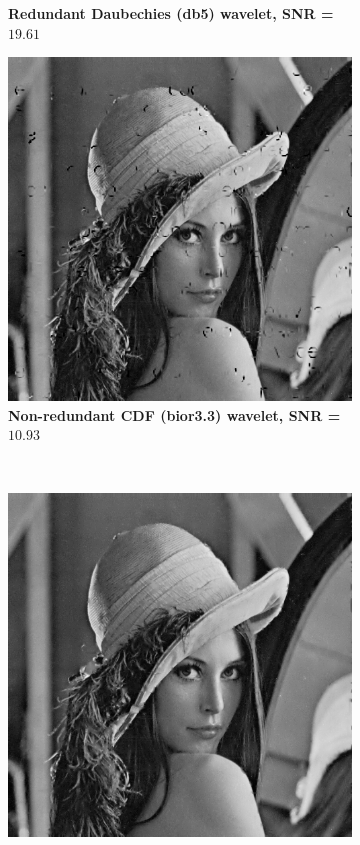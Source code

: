 \begin{figure}
\begin{subfigure}[b]{0.4\textwidth}
        \caption{\textbf{ Redundant Daubechies (db5) wavelet, SNR = $\mathbf{19.61}$} }
        \label{fig:matti_fig_rwt_db5}
    \end{subfigure}
        \begin{subfigure}[b]{0.4\textwidth}
        \includegraphics[width=\textwidth]{../src/inpainting/vraag_2_3_wt_bior33}
        \caption{\textbf{ Non-redundant CDF (bior3.3) wavelet, SNR = $\mathbf{10.93}$} }
        \label{fig:matti_fig_wt_bior33}
    \end{subfigure}
    ~ %
    \begin{subfigure}[b]{0.4\textwidth}
        \includegraphics[width=\textwidth]{../src/inpainting/vraag_2_3_rwt_bior33}

\end{subfigure}
\end{figure}
